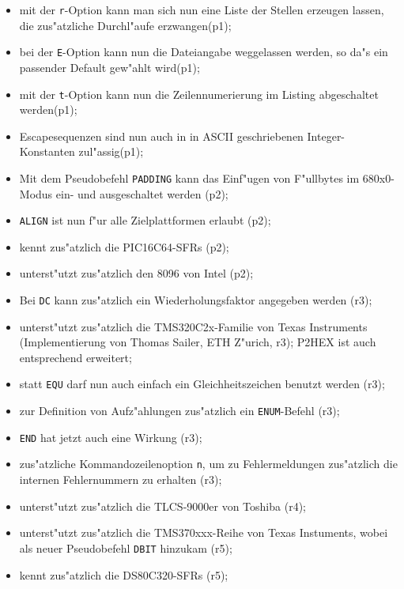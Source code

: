 \documentclass[12pt,a4paper,twoside]{report}
\newcommand{\tty}[1]{{\tt #1}}
\begin{document}
\begin{itemize}
{\begin{itemize}
{            nun auch qualifiziert exportieren(p1);}
      \item{mit der \tty{r}-Option kann man sich nun eine Liste der
            Stellen erzeugen lassen, die zus"atzliche Durchl"aufe
            erzwangen(p1);}
      \item{bei der \tty{E}-Option kann nun die Dateiangabe weggelassen werden,
            so da"s ein passender Default gew"ahlt wird(p1);}
      \item{mit der \tty{t}-Option kann nun die Zeilennumerierung im Listing
            abgeschaltet werden(p1);}
      \item{Escapesequenzen sind nun auch in in ASCII geschriebenen
            Integer-Konstanten zul"assig(p1);}
      \item{Mit dem Pseudobefehl \tty{PADDING} kann das Einf"ugen
            von F"ullbytes im 680x0-Modus ein- und ausgeschaltet
            werden (p2);}
      \item{\tty{ALIGN} ist nun f"ur alle Zielplattformen erlaubt (p2);}
      \item{kennt zus"atzlich die PIC16C64-SFRs (p2);}
      \item{unterst"utzt zus"atzlich den 8096 von Intel (p2);}
      \item{Bei \tty{DC} kann zus"atzlich ein Wiederholungsfaktor angegeben
            werden (r3);}
      \item{unterst"utzt zus"atzlich die TMS320C2x-Familie von Texas
            Instruments (Implementierung von Thomas Sailer, ETH Z"urich,
            r3); P2HEX ist auch entsprechend erweitert;}
      \item{statt \tty{EQU} darf nun auch einfach ein Gleichheitszeichen
            benutzt werden (r3);}
      \item{zur Definition von Aufz"ahlungen zus"atzlich ein
            \tty{ENUM}-Befehl (r3);}
      \item{\tty{END} hat jetzt auch eine Wirkung (r3);}
      \item{zus"atzliche Kommandozeilenoption \tty{n}, um zu Fehlermeldungen
            zus"atzlich die internen Fehlernummern zu erhalten (r3);}
      \item{unterst"utzt zus"atzlich die TLCS-9000er von Toshiba (r4)};
      \item{unterst"utzt zus"atzlich die TMS370xxx-Reihe von Texas
            Instuments, wobei als neuer Pseudobefehl \tty{DBIT}
            hinzukam (r5);}
      \item{kennt zus"atzlich die DS80C320-SFRs (r5);}

\end{itemize}}
\end{itemize}
\end{document}

